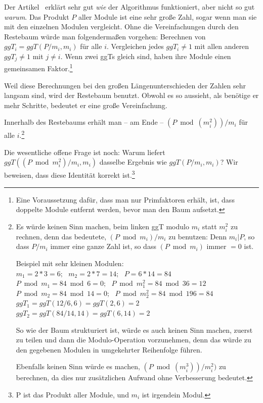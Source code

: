 \begin{refsegment}
Der Artikel~\cite{Heninger2012} erklärt sehr gut \textit{wie} der Algorithmus funktioniert, aber nicht so gut \textit{warum}. Das Produkt $P$ aller Module ist eine sehr große Zahl, sogar wenn man sie mit den einzelnen Modulen vergleicht. Ohne die Vereinfachungen durch den Restebaum würde man folgendermaßen vorgehen: Berechnen von $ggT_{i} = ggT( P / m_{i},  m_{i}) $ für alle $i$. Vergleichen jedes $ggT_{i} \ne 1$ mit allen anderen $ggT_{j} \ne 1$ mit  $j \ne i$. Wenn zwei ggTs gleich sind, haben ihre Module einen gemeinsamen Faktor.\footnote{%
Eine Voraussetzung dafür, dass man nur Primfaktoren erhält, ist, dass doppelte Module entfernt werden, bevor man den Baum aufsetzt.
}

Weil diese Berechnungen bei den großen Längenunterschieden der Zahlen sehr langsam sind, wird der Restebaum benutzt. Obwohl es so aussieht, als benötige er mehr Schritte, bedeutet er eine große Vereinfachung.

Innerhalb des Restebaums erhält man -- am Ende -- $(P \bmod ({m_{i}^{2}}) ) / m_{i}$ für alle $i$.\footnote{%
Es würde keinen Sinn machen, beim linken ggT modulo $m_{i}$ statt $m_{i}^{2}$
zu rechnen, denn das bedeutete, $(P \bmod m_{i} ) / m_{i}$ zu benutzen: Denn
$m_{i} | P$, so dass $P/m_{i}$ immer eine ganze Zahl ist, so dass
$(P \bmod m_{i} )$ immer $= 0$ ist.

\noindent Beispiel mit sehr kleinen Modulen:\\
$ m_{1} = 2*3 = 6;~~~ m_{2} = 2*7 = 14;~~~ P=6*14=84 $\\
$ P \bmod m_{1} = 84 \bmod 6 = 0;~~~ P \bmod {m_{1}^{2}} = 84 \bmod 36 = 12 $\\
$ P \bmod m_{2} = 84 \bmod 14 = 0;~~~ P \bmod {m_{2}^{2}} = 84 \bmod 196 = 84 $\\
$ggT_{1} = ggT(12/6, 6) = ggT(2, 6) = 2 $\\
$ggT_{2} = ggT(84/14, 14) = ggT(6, 14) = 2 $

So wie der Baum strukturiert ist, würde es auch keinen Sinn machen, zuerst zu
teilen und dann die Modulo-Operation vorzunehmen, denn das würde zu den gegebenen Modulen in umgekehrter Reihenfolge führen.

Ebenfalls keinen Sinn würde es machen, $(P \bmod ({m_{i}^{3}}) ) / {m_{i}^{2}})$ zu berechnen, da dies nur zusätzlichen Aufwand ohne Verbesserung bedeutet.
}

Die wesentliche offene Frage ist noch: Warum liefert $ggT((P \bmod {m_{i}^{2}})/ m_{i}, m_{i})$ dasselbe Ergebnis wie $ggT( P / m_{i}, m_{i})$?
Wir beweisen, dass diese Identität korrekt ist.\footnote{%
P ist das Produkt aller Module, und $m_{i}$ ist irgendein Modul.
}


\end{refsegment}
